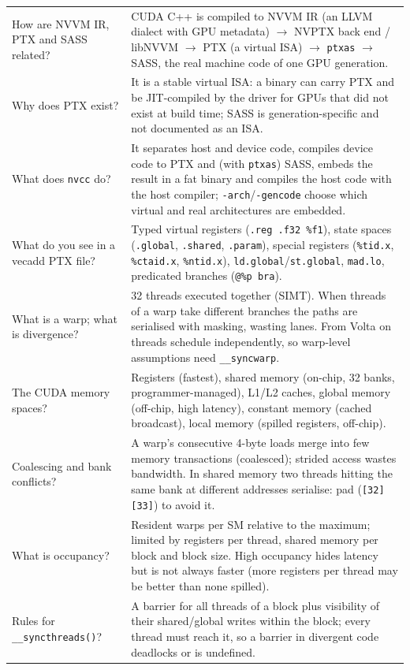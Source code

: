 \documentclass[10pt,a4paper,openany,oneside]{report}
\begin{document}
\begin{center}
\begin{xltabular}{\textwidth}{@{}L{4.6cm}Y@{}}
How are NVVM IR, PTX and SASS related? & CUDA C++ is compiled to NVVM IR (an LLVM dialect with GPU metadata) $\to$ NVPTX back end / libNVVM $\to$ PTX (a virtual ISA) $\to$ \texttt{ptxas} $\to$ SASS, the real machine code of one GPU generation.\\
Why does PTX exist? & It is a stable virtual ISA: a binary can carry PTX and be JIT-compiled by the driver for GPUs that did not exist at build time; SASS is generation-specific and not documented as an ISA.\\
What does \texttt{nvcc} do? & It separates host and device code, compiles device code to PTX and (with \texttt{ptxas}) SASS, embeds the result in a fat binary and compiles the host code with the host compiler; \texttt{-arch}/\texttt{-gencode} choose which virtual and real architectures are embedded.\\
What do you see in a vecadd PTX file? & Typed virtual registers (\texttt{.reg .f32 \%f1}), state spaces (\texttt{.global}, \texttt{.shared}, \texttt{.param}), special registers (\texttt{\%tid.x}, \texttt{\%ctaid.x}, \texttt{\%ntid.x}), \texttt{ld.global}/\texttt{st.global}, \texttt{mad.lo}, predicated branches (\texttt{@\%p bra}).\\
What is a warp; what is divergence? & 32 threads executed together (SIMT). When threads of a warp take different branches the paths are serialised with masking, wasting lanes. From Volta on threads schedule independently, so warp-level assumptions need \texttt{\_\_syncwarp}.\\
The CUDA memory spaces? & Registers (fastest), shared memory (on-chip, 32 banks, programmer-managed), L1/L2 caches, global memory (off-chip, high latency), constant memory (cached broadcast), local memory (spilled registers, off-chip).\\
Coalescing and bank conflicts? & A warp's consecutive 4-byte loads merge into few memory transactions (coalesced); strided access wastes bandwidth. In shared memory two threads hitting the same bank at different addresses serialise: pad (\texttt{[32][33]}) to avoid it.\\
What is occupancy? & Resident warps per SM relative to the maximum; limited by registers per thread, shared memory per block and block size. High occupancy hides latency but is not always faster (more registers per thread may be better than none spilled).\\
Rules for \texttt{\_\_syncthreads()}? & A barrier for all threads of a block plus visibility of their shared/global writes within the block; every thread must reach it, so a barrier in divergent code deadlocks or is undefined.\\

\end{xltabular}
\end{center}
\end{document}
